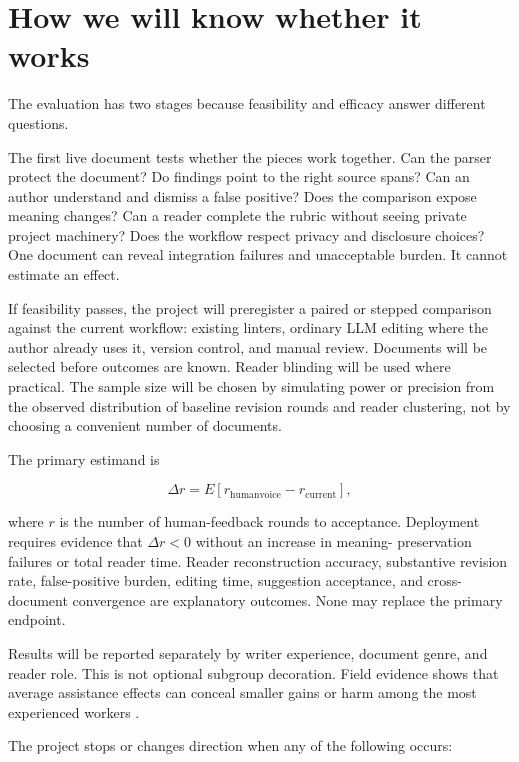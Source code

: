\documentclass[
  11pt,
  english,
]{article}
\begin{document}
\hypertarget{how-we-will-know-whether-it-works}{%
\section{How we will know whether it
works}\label{how-we-will-know-whether-it-works}}

The evaluation has two stages because feasibility and efficacy answer
different questions.

The first live document tests whether the pieces work together. Can the
parser protect the document? Do findings point to the right source
spans? Can an author understand and dismiss a false positive? Does the
comparison expose meaning changes? Can a reader complete the rubric
without seeing private project machinery? Does the workflow respect
privacy and disclosure choices? One document can reveal integration
failures and unacceptable burden. It cannot estimate an effect.

If feasibility passes, the project will preregister a paired or stepped
comparison against the current workflow: existing linters, ordinary LLM
editing where the author already uses it, version control, and manual
review. Documents will be selected before outcomes are known. Reader
blinding will be used where practical. The sample size will be chosen by
simulating power or precision from the observed distribution of baseline
revision rounds and reader clustering, not by choosing a convenient
number of documents.

The primary estimand is

\[
\Delta r = E[r_{\text{humanvoice}} - r_{\text{current}}],
\]

where \(r\) is the number of human-feedback rounds to acceptance.
Deployment requires evidence that \(\Delta r < 0\) without an increase
in meaning- preservation failures or total reader time. Reader
reconstruction accuracy, substantive revision rate, false-positive
burden, editing time, suggestion acceptance, and cross-document
convergence are explanatory outcomes. None may replace the primary
endpoint.

Results will be reported separately by writer experience, document
genre, and reader role. This is not optional subgroup decoration. Field
evidence shows that average assistance effects can conceal smaller gains
or harm among the most experienced workers \citep{brynjolfsson2025work}.

The project stops or changes direction when any of the following occurs:
\end{document}
